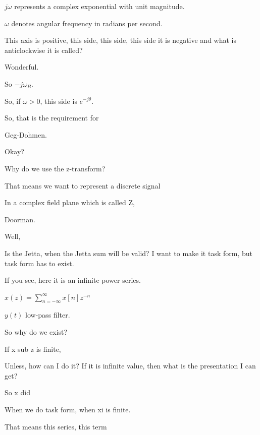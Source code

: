 \documentclass{article}
\begin{document}
$j\omega$ represents a complex exponential with unit magnitude.

$\omega$ denotes angular frequency in radians per second.

This axis is positive, this side, this side, this side it is negative and what is anticlockwise it is called?

Wonderful.

So $-j\omega_B$.

So, if $\omega > 0$, this side is $e^{-j\theta}$.



So, that is the requirement for

Geg-Dohmen.



Okay?



Why do we use the z-transform?

That means we want to represent a discrete signal

In a complex field plane which is called Z,

Doorman.

Well,

Is the Jetta, when the Jetta sum will be valid? I want to make it task form, but task form has to exist.



If you see, here it is an infinite power series.

$x(z) = \sum_{n=-\infty}^{\infty} x[n]z^{-n}$

$y(t)$ low-pass filter.

So why do we exist?

If x sub z is finite,

Unless, how can I do it? If it is infinite value, then what is the presentation I can get?



So x did

When we do task form, when xi is finite.

That means this series, this term
\end{document}
